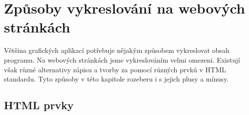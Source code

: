 




\section{Způsoby vykreslování na webových stránkách}\label{text:vykreslovani}

Většina grafických aplikací potřebuje nějakým způsobem vykreslovat obsah programu.
Na webových stránkách jsme vykreslováním velmi omezeni.
Existují však různé alternativy zápisu a tvorby za pomocí různých prvků v HTML standardu.
Tyto způsoby v této kapitole rozeberu i s jejich plusy a mínusy.

\subsection{HTML prvky}\label{text:vykreslovani/html}

